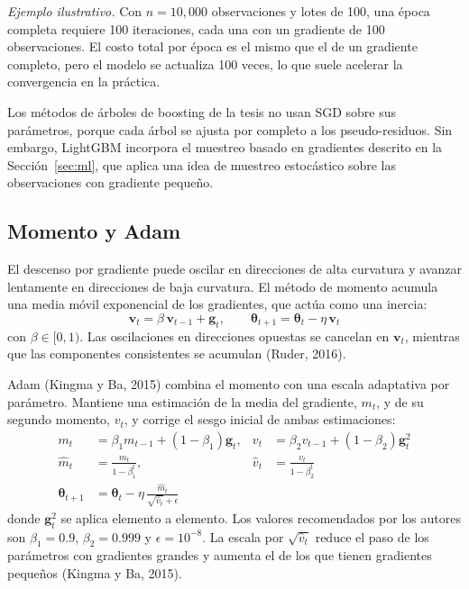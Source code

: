 \textit{Ejemplo ilustrativo.} Con $n=10{,}000$ observaciones y lotes de 100, una época completa requiere 100 iteraciones, cada una con un gradiente de 100 observaciones. El costo total por época es el mismo que el de un gradiente completo, pero el modelo se actualiza 100 veces, lo que suele acelerar la convergencia en la práctica.

Los métodos de árboles de boosting de la tesis no usan SGD sobre sus parámetros, porque cada árbol se ajusta por completo a los pseudo-residuos. Sin embargo, LightGBM incorpora el muestreo basado en gradientes descrito en la Sección~\ref{sec:ml}, que aplica una idea de muestreo estocástico sobre las observaciones con gradiente pequeño.

\subsection{Momento y Adam}
El descenso por gradiente puede oscilar en direcciones de alta curvatura y avanzar lentamente en direcciones de baja curvatura. El método de momento acumula una media móvil exponencial de los gradientes, que actúa como una inercia:
\begin{equation}
\mathbf{v}_t=\beta\,\mathbf{v}_{t-1}+\mathbf{g}_t, \qquad \boldsymbol{\theta}_{t+1}=\boldsymbol{\theta}_t-\eta\,\mathbf{v}_t
\label{eq:momento}
\end{equation}
con $\beta\in[0,1)$. Las oscilaciones en direcciones opuestas se cancelan en $\mathbf{v}_t$, mientras que las componentes consistentes se acumulan (Ruder, 2016).

Adam (Kingma y Ba, 2015) combina el momento con una escala adaptativa por parámetro. Mantiene una estimación de la media del gradiente, $m_t$, y de su segundo momento, $v_t$, y corrige el sesgo inicial de ambas estimaciones:
\begin{align}
m_t &= \beta_1 m_{t-1}+(1-\beta_1)\mathbf{g}_t, & v_t &= \beta_2 v_{t-1}+(1-\beta_2)\mathbf{g}_t^{2} \label{eq:adam_mv}\\
\hat{m}_t &= \frac{m_t}{1-\beta_1^t}, & \hat{v}_t &= \frac{v_t}{1-\beta_2^t} \label{eq:adam_corr}\\
\boldsymbol{\theta}_{t+1} &= \boldsymbol{\theta}_t-\eta\,\frac{\hat{m}_t}{\sqrt{\hat{v}_t}+\epsilon} & & \label{eq:adam_update}
\end{align}
donde $\mathbf{g}_t^{2}$ se aplica elemento a elemento. Los valores recomendados por los autores son $\beta_1=0.9$, $\beta_2=0.999$ y $\epsilon=10^{-8}$. La escala por $\sqrt{\hat{v}_t}$ reduce el paso de los parámetros con gradientes grandes y aumenta el de los que tienen gradientes pequeños (Kingma y Ba, 2015).

